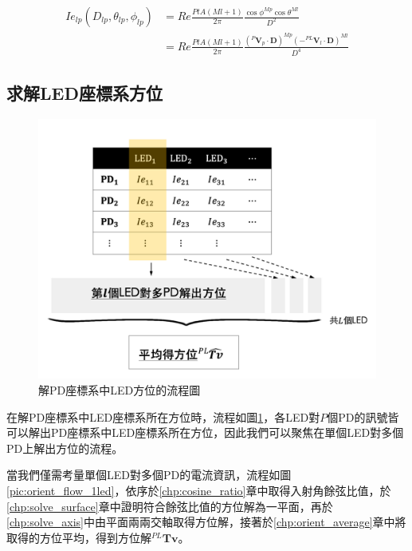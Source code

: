     \begin{equation}
        \label{eqn:model_algorithm_filter}
        \begin{aligned}
            Ie_{lp}(D_{lp},\theta_{lp},\phi_{lp}) &= Re\frac{PtA(Ml+1)}{2\pi}\frac{{\cos\phi}^{Mp}{\cos\theta}^{Ml}}{D^2}\\
            & = Re\frac{PtA(Ml+1)}{2\pi}\frac{{(^{P}\boldsymbol{V}_p\cdot\boldsymbol{D})}^{Mp}{(-^{PL}\boldsymbol{V}_l\cdot\boldsymbol{D})}^{Ml}}{D^4}
        \end{aligned}
    \end{equation}




    \subsection{求解LED座標系方位}
    \label{chp:solve_phi}

    \begin{figure}[htpb]
        \centering
        \includegraphics[width=12cm]{ch3pic/orient_flow.png}
        \caption{解PD座標系中LED方位的流程圖}
        \label{pic:orient_flow}
    \end{figure}

    

    在解PD座標系中LED座標系所在方位時，流程如圖\ref{pic:orient_flow}，各LED對$P$個PD的訊號皆可以解出PD座標系中LED座標系所在方位，因此我們可以聚焦在單個LED對多個PD上解出方位的流程。
    
    當我們僅需考量單個LED對多個PD的電流資訊，流程如圖\ref{pic:orient_flow_1led}，依序於\ref{chp:cosine_ratio}章中取得入射角餘弦比值，於\ref{chp:solve_surface}章中證明符合餘弦比值的方位解為一平面，再於\ref{chp:solve_axis}中由平面兩兩交軸取得方位解，接著於\ref{chp:orient_average}章中將取得的方位平均，得到方位解$^{PL}\boldsymbol{Tv}$。

